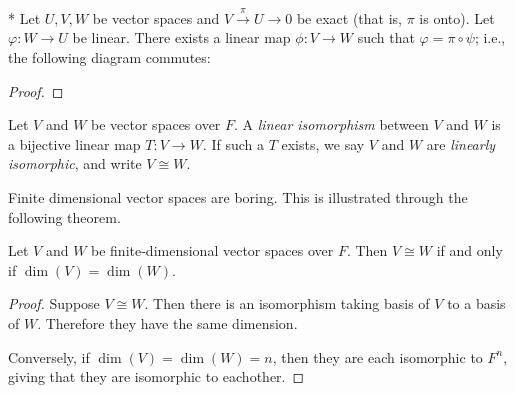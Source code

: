    \begin{proposition}*
        Let $U,V,W$ be vector spaces and $V \xrightarrow{\pi}U \rightarrow 0$ be exact (that is, $\pi$ is onto). Let $\varphi:W \rightarrow U$ be linear. There exists a linear map $\phi:V \rightarrow W$ such that $\varphi = \pi \circ \psi$; i.e., the following diagram commutes:
            \begin{center}
            \end{center}
    \end{proposition}
        \begin{proof}
            
        \end{proof}

    \begin{definition}
        Let $V$ and $W$ be vector spaces over $F$. A \textit{linear isomorphism} between $V$ and $W$ is a bijective linear map $T:V \rightarrow W$. If such a $T$ exists, we say $V$ and $W$ are \textit{linearly isomorphic}, and write $V \cong W$.
    \end{definition}

    \begin{center}
    \end{center}

    Finite dimensional vector spaces are boring. This is illustrated through the following theorem.

    \begin{theorem}
        Let $V$ and $W$ be finite-dimensional vector spaces over $F$. Then $V \cong W$ if and only if $\dim(V) = \dim(W)$.
    \end{theorem}
        \begin{proof}
            Suppose $V \cong W$. Then there is an isomorphism taking basis of $V$ to a basis of $W$. Therefore they have the same dimension.

            Conversely, if $\dim(V) = \dim(W) = n$, then they are each isomorphic to $F^n$, giving that they are isomorphic to eachother.
        \end{proof}

